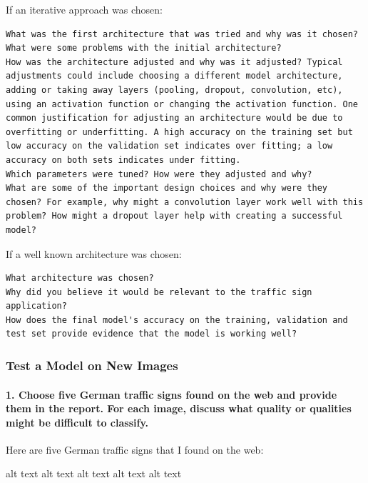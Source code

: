 \documentclass[11pt]{article}
\begin{document}
If an iterative approach was chosen:

\begin{verbatim}
What was the first architecture that was tried and why was it chosen?
What were some problems with the initial architecture?
How was the architecture adjusted and why was it adjusted? Typical adjustments could include choosing a different model architecture, adding or taking away layers (pooling, dropout, convolution, etc), using an activation function or changing the activation function. One common justification for adjusting an architecture would be due to overfitting or underfitting. A high accuracy on the training set but low accuracy on the validation set indicates over fitting; a low accuracy on both sets indicates under fitting.
Which parameters were tuned? How were they adjusted and why?
What are some of the important design choices and why were they chosen? For example, why might a convolution layer work well with this problem? How might a dropout layer help with creating a successful model?
\end{verbatim}

If a well known architecture was chosen:

\begin{verbatim}
What architecture was chosen?
Why did you believe it would be relevant to the traffic sign application?
How does the final model's accuracy on the training, validation and test set provide evidence that the model is working well?
\end{verbatim}

\subsubsection{Test a Model on New
Images}\label{test-a-model-on-new-images}

\paragraph{1. Choose five German traffic signs found on the web and
provide them in the report. For each image, discuss what quality or
qualities might be difficult to
classify.}\label{choose-five-german-traffic-signs-found-on-the-web-and-provide-them-in-the-report.-for-each-image-discuss-what-quality-or-qualities-might-be-difficult-to-classify.}

Here are five German traffic signs that I found on the web:

alt text alt text alt text alt text alt text
\end{document}
